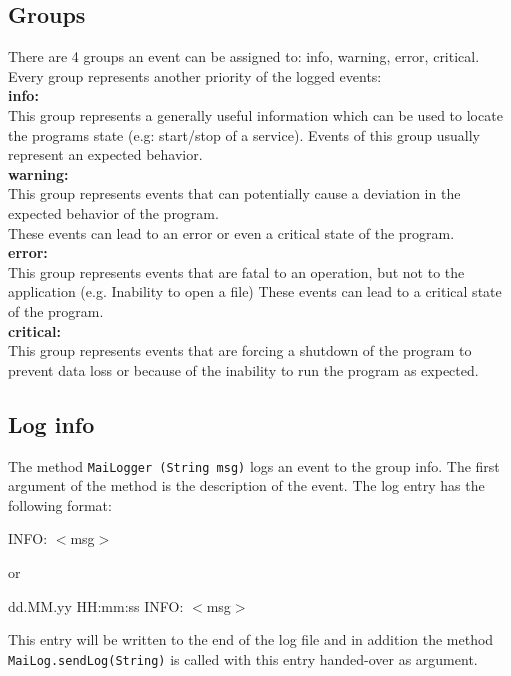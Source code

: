 \documentclass{article}
\begin{document}
\label{logging}
    \subsection{Groups}
    \label{groups}
    There are 4 groups an event can be assigned to: info, warning, error, critical.
    Every group represents another priority of the logged events: \\

    \textbf{info:} \\
    This group represents a generally useful information which can be used to locate the programs state (e.g: start/stop of a service).
    Events of this group usually represent an expected behavior. \\

    \textbf{warning:} \\
    This group represents events that can potentially cause a deviation in the expected behavior of the program. \\
    These events can lead to an error or even a critical state of the program. \\

    \textbf{error:} \\
    This group represents events that are fatal to an operation, but not to the application (e.g. Inability to open a file)
    These events can lead to a critical state of the program. \\

    \textbf{critical:} \\
    This group represents events that are forcing a shutdown of the program to prevent data loss or because of the inability to run the program as expected.

    \subsection{Log info}
\label{logging_info}
    The method \lstinline|MaiLogger (String msg)| logs an event to the group info.
    The first argument of the method is the description of the event.
    The log entry has the following format:
    \begin{description}
        \item INFO: $<$msg$>$
        \item or
        \item dd.MM.yy HH:mm:ss INFO: $<$msg$>$
    \end{description}
    This entry will be written to the end of the log file and in addition the method \lstinline|MaiLog.sendLog(String)| is called with this entry handed-over as argument.
\end{document}
